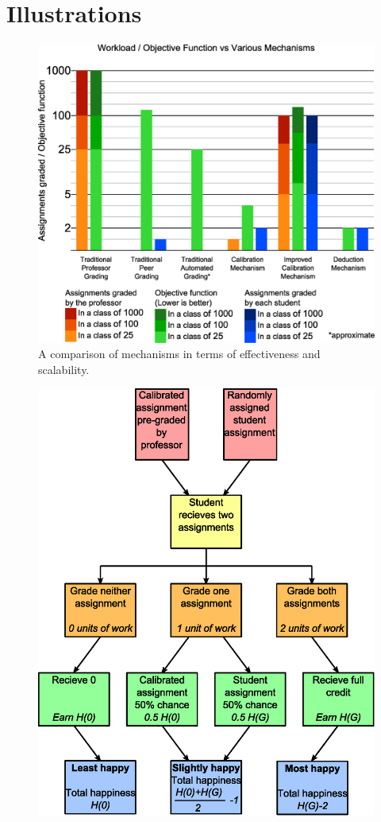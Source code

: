 \documentclass[12pt, Arial]{article}
\begin{document}
\section{Illustrations}
{
\noindent
\begin{figure}[!h]
	\centering
		\includegraphics[width=\textwidth]{Comparison.eps}
		\caption {A comparison of mechanisms in terms of effectiveness and scalability.\label{fig:comparison}}
\end{figure}
\begin{figure}
	\centering
		\includegraphics[width=\textwidth]{Flowchart-Calibration.eps}

\end{figure}}
\end{document}
